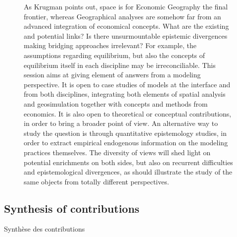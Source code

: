 \begin{figure}[h!]
\begin{mdframed}
	
	As Krugman points out, space is for Economic Geography the final frontier, whereas Geographical analyses are somehow far from an advanced integration of economical concepts. What are the existing and potential links? Is there unsurmountable epistemic divergences making bridging approaches irrelevant? For example, the assumptions regarding equilibrium, but also the concepts of equilibrium itself in each discipline may be irreconciliable. This session aims at giving element of answers from a modeling perspective. It is open to case studies of models at the interface and from both disciplines, integrating both elements of spatial analysis and geosimulation together with concepts and methods from economics. It is also open to theoretical or conceptual contributions, in order to bring a broader point of view. An alternative way to study the question is through quantitative epistemology studies, in order to extract empirical endogenous information on the modeling practices themselves. The diversity of views will shed light on potential enrichments on both sides, but also on recurrent difficulties and epistemological divergences, as should illustrate the study of the same objects from totally different perspectives.
	
	\medskip
	
\end{mdframed}
\end{figure}



\subsection*{Synthesis of contributions}{Synthèse des contributions}

